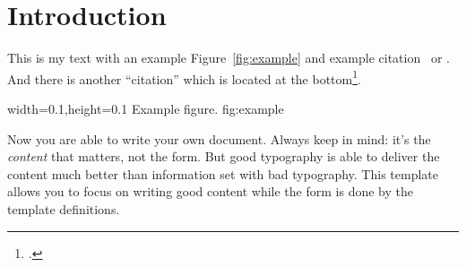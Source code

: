 

\chapter{Introduction}

This is my text with an example Figure~\ref{fig:example} and example
citation~\cite{StrunkWhite} or \textcite{Bringhurst1993}. And there is another
\enquote{citation} which is located at the bottom\footcite{tagstore}.

  {width=0.1\textwidth,height=0.1\textheight}%
  {Example figure.}%
  {}%
  {fig:example}%

Now you are able to write your own document. Always keep in mind: it's
the \emph{content} that matters, not the form. But good typography is
able to deliver the content much better than information set with bad
typography. This template allows you to focus on writing good content
while the form is done by the template definitions.


